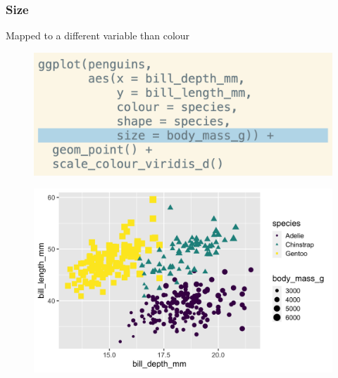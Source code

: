\documentclass[11pt]{beamer}
\begin{document}
\begin{frame}
	\frametitle{\textbf{Size}}
	Mapped to a different variable than colour
	
	\begin{minipage}[t]{0.5\linewidth}
		\begin{figure}
			\centering
			\includegraphics[width=1\linewidth]{Images/S2/code/s20}
			
		\end{figure}
	\end{minipage}%
	\begin{minipage}[t]{0.5\linewidth}
		
		\begin{figure}
			\centering
			\includegraphics[width=1\linewidth]{Images/S2/size-1}
			
		\end{figure}
		
		
	\end{minipage}
	
	
\end{frame}
\end{document}
